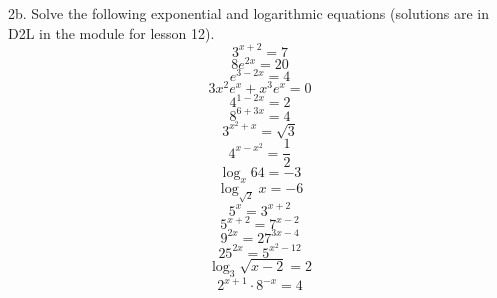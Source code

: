 \documentclass[11pt]{article}
\begin{document}
2b. Solve the following exponential and logarithmic equations
(solutions are in D2L in the module for lesson 12).
\begin{equation}
  \label{eq:faeyeije}
  3^{x+2}=7
\end{equation}
\begin{equation}
  \label{eq:ochedoxi}
  8e^{2x}=20
\end{equation}
\begin{equation}
  \label{eq:veipoeyu}
  e^{3-2x}=4
\end{equation}
\begin{equation}
  \label{eq:aquusahm}
  3x^{2}e^{x}+x^{3}e^{x}=0
\end{equation}
  \begin{equation}
    \label{eq:rohkiine}
    4^{1-2x}=2
  \end{equation}
  \begin{equation}
    \label{eq:zahsuini}
    8^{6+3x}=4
  \end{equation}
  \begin{equation}
    \label{eq:iaphaeya}
    3^{x^{2}+x}=\sqrt{3}
  \end{equation}
  \begin{equation}
    \label{eq:iebaiviu}
    4^{x-x^{2}}=\frac{1}{2}
  \end{equation}
  \begin{equation}
    \label{eq:maareiju}
    \log_{x}64=-3
  \end{equation}
  \begin{equation}
    \label{eq:sheuroov}
    \log_{\sqrt{2}}x=-6
  \end{equation}
  \begin{equation}
    \label{eq:dairithe}
    5^{x}=3^{x+2}
  \end{equation}
  \begin{equation}
    \label{eq:seizieng}
    5^{x+2}=7^{x-2}
  \end{equation}
  \begin{equation}
    \label{eq:ceivapuw}
    9^{2x}=27^{3x-4}
  \end{equation}
  \begin{equation}
    \label{eq:eefohvoh}
    25^{2x}=5^{x^{2}-12}
  \end{equation}
  \begin{equation}
    \label{eq:xiefepib}
    \log_{3}\sqrt{x-2}=2
  \end{equation}
  \begin{equation}
    \label{eq:eegaifah}
    2^{x+1}\cdot{}8^{-x}=4
  \end{equation}
\end{document}
